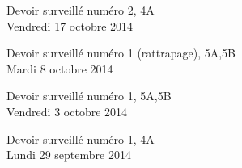 \documentclass[a4paper,10pt]{article}
\begin{document}
\begin{feuilleDS}{Devoir surveillé numéro 2, 4A\\ \small Vendredi 17 octobre 2014}
\end{feuilleDS}


\begin{feuilleDS}{Devoir surveillé numéro 1 (rattrapage), 5A,5B\\ \small Mardi 8 octobre 2014}
\end{feuilleDS}


\begin{feuilleDS}{Devoir surveillé numéro 1, 5A,5B\\ \small Vendredi 3 octobre 2014}
\end{feuilleDS}



\begin{feuilleDS}{Devoir surveillé numéro 1, 4A\\ \small Lundi 29 septembre 2014}

\end{feuilleDS}
\end{document}
